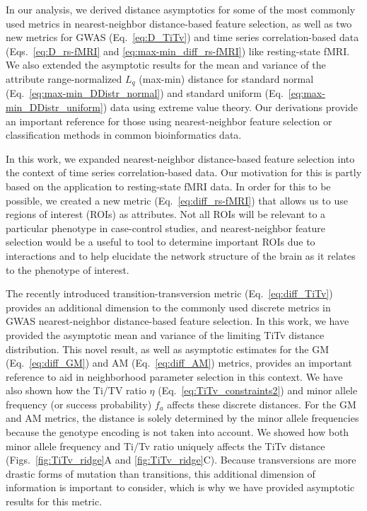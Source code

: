 \documentclass[aos]{imsart}
\begin{document}
In our analysis, we derived distance asymptotics for some of the most commonly used metrics in nearest-neighbor distance-based feature selection, as well as two new metrics for GWAS (Eq.~\ref{eq:D_TiTv}) and time series correlation-based data (Eqs.~\ref{eq:D_rs-fMRI} and \ref{eq:max-min_diff_rs-fMRI}) like resting-state fMRI. We also extended the asymptotic results for the mean and variance of the attribute range-normalized $L_q$ (max-min) distance for standard normal (Eq.~\ref{eq:max-min_DDistr_normal}) and standard uniform (Eq.~\ref{eq:max-min_DDistr_uniform}) data using extreme value theory. Our derivations provide an important reference for those using nearest-neighbor feature selection or classification methods in common bioinformatics data. 

In this work, we expanded nearest-neighbor distance-based feature selection into the context of time series correlation-based data. Our motivation for this is partly based on the application to resting-state fMRI data. In order for this to be possible, we created a new metric (Eq.~\ref{eq:diff_rs-fMRI}) that allows us to use regions of interest (ROIs) as attributes. Not all ROIs will be relevant to a particular phenotype in case-control studies, and nearest-neighbor feature selection would be a useful to tool to determine important ROIs due to interactions and to help elucidate the network structure of the brain as it relates to the phenotype of interest.

The recently introduced transition-transversion metric (Eq.~\ref{eq:diff_TiTv}) provides an additional dimension to the commonly used discrete metrics in GWAS nearest-neighbor distance-based feature selection. In this work, we have provided the asymptotic mean and variance of the limiting TiTv distance distribution. This novel result, as well as asymptotic estimates for the GM (Eq.~\ref{eq:diff_GM}) and AM (Eq.~\ref{eq:diff_AM}) metrics, provides an important reference to aid in neighborhood parameter selection in this context. We have also shown how the Ti/TV ratio $\eta$ (Eq.~\ref{eq:TiTv_constraints2}) and minor allele frequency (or success probability) $f_a$ affects these discrete distances. For the GM and AM metrics, the distance is solely determined by the minor allele frequencies because the genotype encoding is not taken into account. We showed how both minor allele frequency and Ti/Tv ratio uniquely affects the TiTv distance (Figs.~\ref{fig:TiTv_ridge}A and \ref{fig:TiTv_ridge}C). Because transversions are more drastic forms of mutation than transitions, this additional dimension of information is important to consider, which is why we have provided asymptotic results for this metric.
\end{document}
